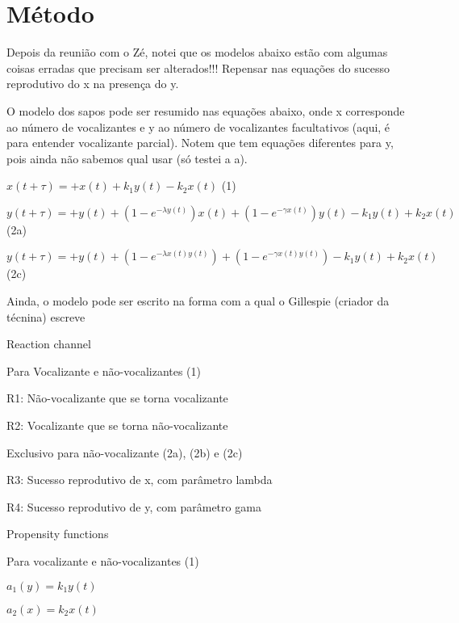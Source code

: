\section{Método}\label{Metodo}

Depois da reunião com o Zé, notei que os modelos abaixo estão com algumas coisas erradas que precisam ser alterados!!! Repensar nas equações do sucesso reprodutivo do x na presença do y.

O modelo dos sapos pode ser resumido nas equações abaixo, onde x corresponde ao número de vocalizantes e y ao número de vocalizantes facultativos (aqui, é para entender vocalizante parcial). Notem que tem  equações diferentes para y, pois ainda não sabemos qual usar (só testei a a).

\begin{center}
\vspace{3 mm}
$x(t + \tau)= +x(t) +k_1 y(t) -k_2 x(t)$ (1)

\vspace{3 mm}
$y(t + \tau)= +y(t) + (1-e^{-\lambda y(t)})x(t) + (1-e^{-\gamma x(t)})y(t) -k_1 y(t) +k_2 x(t)$ (2a)

\vspace{3 mm}
$y(t + \tau)= +y(t) + (1-e^{-\lambda x(t)y(t)}) + (1-e^{-\gamma x(t)y(t)}) -k_1 y(t) +k_2 x(t)$ (2c)
\end{center}

Ainda, o modelo pode ser escrito na forma com a qual o Gillespie (criador da técnina) escreve

Reaction channel

Para Vocalizante e não-vocalizantes (1)

R1: Não-vocalizante que se torna vocalizante

R2: Vocalizante que se torna não-vocalizante

Exclusivo para não-vocalizante (2a), (2b) e (2c)

R3: Sucesso reprodutivo de x, com parâmetro lambda

R4: Sucesso reprodutivo de y, com parâmetro gama

Propensity functions

Para vocalizante e não-vocalizantes (1)

\begin{center}
\vspace{3 mm}
$a_1(y)=k_1 y(t)$

\vspace{3 mm}
$a_2(x)=k_2 x(t)$
\end{center}

